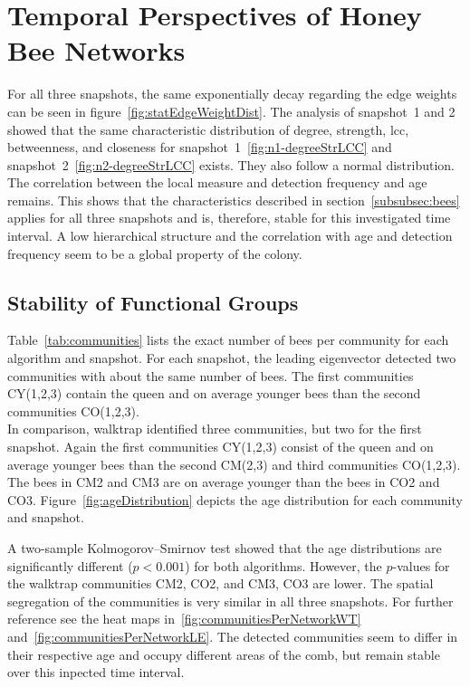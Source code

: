 \section{Temporal Perspectives of Honey Bee Networks}

For all three snapshots, the same exponentially decay regarding the edge weights can be seen in figure~\ref{fig:statEdgeWeightDist}.
The analysis of snapshot~1 and 2 showed that the same characteristic distribution of degree, strength, lcc, betweenness, and closeness for snapshot~1~\ref{fig:n1-degreeStrLCC} and snapshot~2~\ref{fig:n2-degreeStrLCC} exists. They also follow a normal distribution. The correlation between the local measure and detection frequency and age remains.
This shows that the characteristics described in section~\ref{subsubsec:bees} applies for all three snapshots and is, therefore, stable for this investigated time interval. A low hierarchical structure and the correlation with age and detection frequency seem to be a global property of the colony.

\subsection{Stability of Functional Groups}
Table~\ref{tab:communities} lists the exact number of bees per community for each algorithm and snapshot.
For each snapshot, the leading eigenvector detected two communities with about the same number of bees.
The first communities CY(1,2,3) contain the queen and on average younger bees than the second communities CO(1,2,3).\\
In comparison, walktrap identified three communities, but two for the first snapshot.
Again the first communities CY(1,2,3) consist of the queen and on average younger bees than the second CM(2,3) and third communities CO(1,2,3).
The bees in CM2 and CM3 are on average younger than the bees in CO2 and CO3.
Figure~\ref{fig:ageDistribution} depicts the age distribution for each community and snapshot.

A two-sample Kolmogorov–Smirnov test showed that the age distributions are significantly different ($p< 0.001$) for both algorithms. However, the $p$-values for the walktrap communities CM2, CO2, and CM3, CO3 are lower.
The spatial segregation of the communities is very similar in all three snapshots. For further reference see the heat maps in~\ref{fig:communitiesPerNetworkWT} and~\ref{fig:communitiesPerNetworkLE}.
The detected communities seem to differ in their respective age and occupy different areas of the comb, but remain stable over this inpected time interval.

